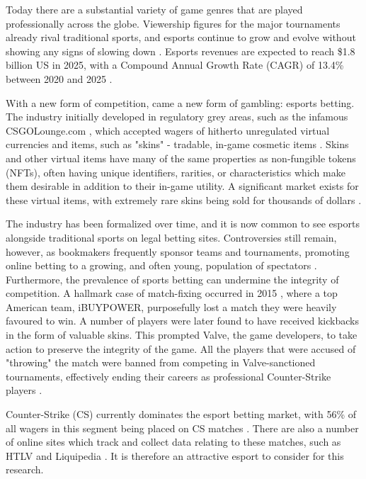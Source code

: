 Today there are a substantial variety of game genres that are played professionally across the globe. Viewership figures for the major tournaments already rival traditional sports, and esports continue to grow and evolve without showing any signs of slowing down \cite{growthofesports}\cite{proesports-book}.  Esports revenues are expected to reach \$1.8 billion US in 2025, with a Compound Annual Growth Rate (CAGR) of 13.4\% between 2020 and 2025 \cite{growthofesports}. 

With a new form of competition, came a new form of gambling: esports betting. The industry initially developed in regulatory grey areas, such as the infamous CSGOLounge.com \cite{hardenstein2017skins}, which accepted wagers of hitherto unregulated virtual currencies and items, such as "skins" - tradable, in-game cosmetic items \cite{esportsgambling}. Skins and other virtual items have many of the same properties as non-fungible tokens (NFTs), often having unique identifiers, rarities, or characteristics which make them desirable in addition to their in-game utility. A significant market exists for these virtual items, with extremely rare skins being sold for thousands of dollars \cite{hardenstein2017skins}. 

The industry has been formalized over time, and it is now common to see esports alongside traditional sports on legal betting sites. Controversies still remain, however, as bookmakers frequently sponsor teams and tournaments, promoting online betting to a growing, and often young, population of spectators \cite{bettingsponsors}. Furthermore, the prevalence of sports betting can undermine the integrity of competition. A hallmark case of match-fixing occurred in 2015 \cite{matchfixing}, where a top American team, iBUYPOWER, purposefully lost a match they were heavily favoured to win. A number of players were later found to have received kickbacks in the form of valuable skins. This prompted Valve, the game developers, to take action to preserve the integrity of the game. All the players that were accused of "throwing" the match were banned from competing in Valve-sanctioned tournaments, effectively ending their careers as professional Counter-Strike players \cite{ibuypower}.

Counter-Strike (CS) currently dominates the esport betting market, with 56\% of all wagers in this segment being placed on CS matches \cite{abios_report}. There are also a number of online sites which track and collect data relating to these matches, such as HTLV \cite{hltv-about} and Liquipedia \cite{liquipedia-prizepool}. It is therefore an attractive esport to consider for this research.


